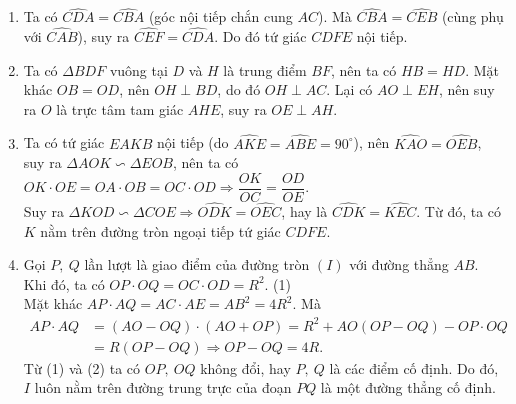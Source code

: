 \begin{ex}
{\begin{center}
		\end{center}
		\begin{enumerate}
			\item Ta có $\widehat{CDA}=\widehat{CBA}$ (góc nội tiếp chắn cung $AC$). Mà $\widehat{CBA}=\widehat{CEB}$ (cùng phụ với $\widehat{CAB}$), suy ra $\widehat{CEF}=\widehat{CDA}$. Do đó tứ giác $CDFE$ nội tiếp.
			\item  Ta có $\Delta BDF$ vuông tại $D$ và $H$ là trung điểm $BF$, nên ta có $HB=HD$. Mặt khác $OB=OD$, nên $OH \perp BD$, do đó $OH \perp AC$. Lại có $AO \perp EH$, nên suy ra $O$ là trực tâm tam giác $AHE$, suy ra $OE \perp AH.$
			\item  Ta có tứ giác $EAKB$ nội tiếp (do $\widehat{AKE}=\widehat{ABE}=90^\circ$), nên $\widehat{KAO}=\widehat{OEB}$, suy ra $\Delta AOK \backsim \Delta EOB$, nên ta có $OK\cdot OE =OA\cdot OB=OC\cdot OD \Rightarrow \dfrac{OK}{OC}=\dfrac{OD}{OE}.$\\ Suy ra $\Delta KOD \backsim \Delta COE \Rightarrow \widehat{ODK}= \widehat{OEC}$, hay là $\widehat{CDK}= \widehat{KEC}$. Từ đó, ta có $K$ nằm trên đường tròn ngoại tiếp tứ giác $CDFE.$
			\item  Gọi $P,\ Q$ lần lượt là giao điểm của đường tròn $(I)$ với đường thẳng $AB$.\\ Khi đó, ta có $OP\cdot OQ=OC\cdot OD=R^2$. \hfill (1)\\
			Mặt khác $AP\cdot AQ=AC\cdot AE =AB^2=4R^2$. Mà 
			 \begin{align*} AP \cdot AQ&=(AO-OQ)\cdot (AO+OP)=R^2+AO(OP-OQ)-OP\cdot OQ\\&=R(OP-OQ) \Rightarrow OP-OQ=4R. \tag{2} \end{align*}
			Từ (1) và (2) ta có $OP,\ OQ$ không đổi, hay $P,\ Q$ là các điểm cố định. Do đó, $I$ luôn nằm trên đường trung trực của đoạn $PQ$ là một đường thẳng cố định.
		\end{enumerate}
	}
	
\end{ex}


